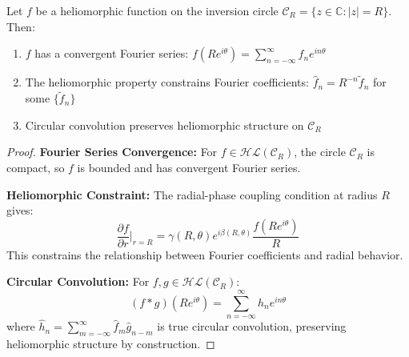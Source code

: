 \begin{theorem}
\label{thm:heliomorphic_fourier}
Let $f$ be a heliomorphic function on the inversion circle $\mathcal{C}_R = \{z \in \mathbb{C} : |z| = R\}$. Then:
\begin{enumerate}
    \item $f$ has a convergent Fourier series: $f(Re^{i\theta}) = \sum_{n=-\infty}^{\infty} \hat{f}_n e^{in\theta}$
    \item The heliomorphic property constrains Fourier coefficients: $\hat{f}_n = R^{-n} \tilde{f}_n$ for some $\{\tilde{f}_n\}$
    \item Circular convolution preserves heliomorphic structure on $\mathcal{C}_R$
\end{enumerate}
\end{theorem}

\begin{proof}
\textbf{Fourier Series Convergence:} For $f \in \mathcal{HL}(\mathcal{C}_R)$, the circle $\mathcal{C}_R$ is compact, so $f$ is bounded and has convergent Fourier series.

\textbf{Heliomorphic Constraint:} The radial-phase coupling condition at radius $R$ gives:
$$\frac{\partial f}{\partial r}\bigg|_{r=R} = \gamma(R,\theta) e^{i\beta(R,\theta)} \frac{f(Re^{i\theta})}{R}$$
This constrains the relationship between Fourier coefficients and radial behavior.

\textbf{Circular Convolution:} For $f, g \in \mathcal{HL}(\mathcal{C}_R)$:
$$(f * g)(Re^{i\theta}) = \sum_{n=-\infty}^{\infty} \hat{h}_n e^{in\theta}$$
where $\hat{h}_n = \sum_{m=-\infty}^{\infty} \hat{f}_m \hat{g}_{n-m}$ is true circular convolution, preserving heliomorphic structure by construction.
\end{proof}

